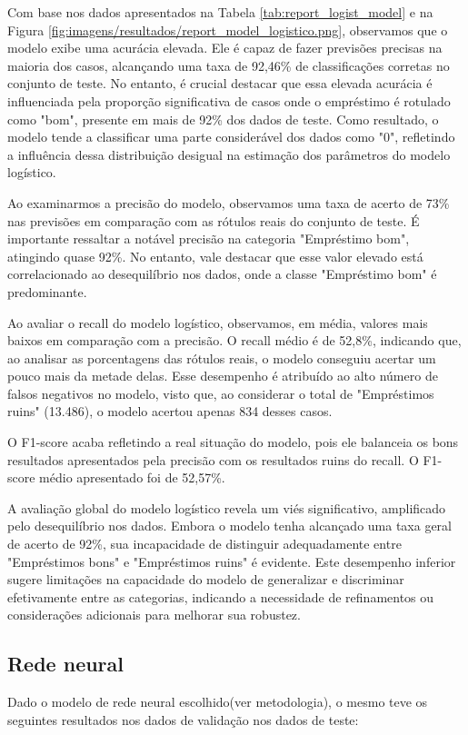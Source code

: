 Com base nos dados apresentados na Tabela \ref{tab:report_logist_model}
e na Figura \ref{fig:imagens/resultados/report_model_logistico.png},
observamos que o modelo exibe uma acurácia elevada. Ele é capaz de fazer 
previsões precisas na maioria dos casos, alcançando uma taxa de 92,46\% 
de classificações corretas no conjunto de teste. No entanto, 
é crucial destacar que essa elevada acurácia é influenciada pela proporção
significativa de casos onde o empréstimo é rotulado como "bom", presente 
em mais de 92\% dos dados de teste. Como resultado, o modelo tende a
classificar uma parte considerável dos dados como "0", refletindo a
influência dessa distribuição desigual na estimação dos parâmetros do modelo logístico. 


Ao examinarmos a precisão do modelo, observamos uma taxa de acerto de 73\%
nas previsões em comparação com as rótulos reais do conjunto de teste. 
É importante ressaltar a notável precisão na categoria "Empréstimo bom", atingindo quase 92\%. 
No entanto, vale destacar que esse valor elevado está correlacionado ao desequilíbrio nos dados,
onde a classe "Empréstimo bom" é predominante.

Ao avaliar o recall do modelo logístico, observamos, em média,
valores mais baixos em comparação com a precisão. O recall médio é de 52,8\%, 
indicando que, ao analisar as porcentagens das rótulos reais, o modelo conseguiu 
acertar um pouco mais da metade delas. Esse desempenho é atribuído ao alto número 
de falsos negativos no modelo, visto que, ao considerar o total de "Empréstimos ruins" (13.486),
 o modelo acertou apenas 834 desses casos.

O F1-score acaba refletindo a real situação do modelo, pois ele balanceia os bons resultados
apresentados pela precisão com os resultados ruins do recall. O F1-score médio apresentado foi
de 52,57\%.

A avaliação global do modelo logístico revela um viés significativo, amplificado pelo desequilíbrio nos dados.
Embora o modelo tenha alcançado uma taxa geral de acerto de 92\%, sua incapacidade de distinguir
adequadamente entre "Empréstimos bons" e "Empréstimos ruins" é evidente. 
Este desempenho inferior sugere limitações na capacidade do modelo de generalizar e
discriminar efetivamente entre as categorias, indicando a necessidade de refinamentos ou 
considerações adicionais para melhorar sua robustez.


\subsection{Rede neural}
Dado o modelo de rede neural escolhido(ver metodologia), o mesmo teve os seguintes resultados nos dados
de validação nos dados de teste:

